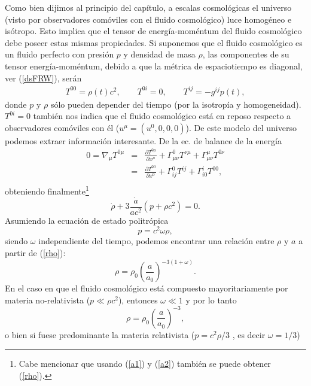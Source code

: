 Como bien dijimos al principio del capítulo, a escalas cosmológicas el universo (visto por observadores comóviles con el fluido cosmológico) luce homogéneo e isótropo. 
Esto implica que el tensor de energía-moméntum del fluido cosmológico debe poseer estas mismas propiedades. Si suponemos que
el fluido cosmológico es un fluido perfecto con presión $p$ y densidad de masa $\rho$, las componentes de su tensor energía-moméntum, debido a que la métrica
de espaciotiempo  es diagonal, ver (\ref{dsFRW}), serán
\begin{eqnarray}
T^{00}=\rho(t)c^2,\qquad T^{0i}=0, \qquad T^{ij}= -g^{ij}p(t),
\end{eqnarray}
donde $p$ y $\rho$ sólo pueden depender del tiempo (por la isotropía y homogeneidad). $T^{0i}=0$ también nos indica que el fluido cosmológico
está en reposo respecto a observadores comóviles con él ($u^\mu=(u^0,0,0,0)$).
De este modelo del universo podemos extraer información interesante. De la ec. de balance de la energía %
\begin{eqnarray}
0 = \nabla_\mu T^{0\mu}&=& \frac{\partial T^{0\mu}}{\partial x^\mu} + \Gamma^{0}_{\mu\nu} T^{\nu \mu} + \Gamma^{\mu}_{\mu \nu} T^{0\nu}\\
                   &=& \frac{\partial T^{00}}{\partial x^0} + \Gamma^{0}_{ij} T^{ij} + \Gamma^{i}_{i0} T^{00},\\
\end{eqnarray}
obteniendo finalmente\footnote{Cabe mencionar que usando (\ref{a1}) y (\ref{a2}) también se puede obtener (\ref{rho}).}
\begin{equation}
\boxed{\dot \rho +3\frac{\dot a}{ac^2}(p+\rho c^2)= 0.} \label{rho} 
\end{equation}
Asumiendo la ecuación de estado politrópica
\begin{equation}
p=c^2\omega \rho,
\end{equation}
siendo $\omega$ independiente del tiempo, podemos encontrar una relación entre $\rho$ y $a$ a partir de (\ref{rho}):
\begin{equation}
\rho =\rho_0 \left(\frac{a}{a_0}\right)^{-3(1+\omega)}.
\end{equation}
En el caso en que el fluido cosmológico está compuesto mayoritariamente por materia no-relativista ($p\ll \rho c^{2}$), entonces $\omega \ll 1$ y por lo tanto
\begin{equation}
\rho =\rho_0 \left(\frac{a}{a_0}\right)^{-3}, \label{materia}
\end{equation}
o bien si fuese predominante la materia relativista ($p=c^{2}\rho/3$ , es decir $\omega = 1/3$)

